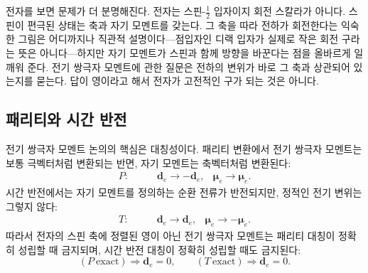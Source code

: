 전자를 보면 문제가 더 분명해진다. 전자는 스핀-\(\tfrac12\) 입자이지 회전 스칼라가 아니다. 스핀이 편극된 상태는 축과 자기 모멘트를 갖는다. 그 축을 따라 전하가 회전한다는 익숙한 그림은 어디까지나 직관적 설명이다---점입자인 디랙 입자가 실제로 작은 회전 구라는 뜻은 아니다---하지만 자기 모멘트가 스핀과 함께 방향을 바꾼다는 점을 올바르게 일깨워 준다. 전기 쌍극자 모멘트에 관한 질문은 전하의 변위가 바로 그 축과 상관되어 있는지를 묻는다. 답이 영이라고 해서 전자가 고전적인 구가 되는 것은 아니다.

\begin{classroomqa}
\end{classroomqa}

\begin{classroomqa}
\end{classroomqa}

\subsection{패리티와 시간 반전}

전기 쌍극자 모멘트 논의의 핵심은 대칭성이다. 패리티 변환에서 전기 쌍극자 모멘트는 보통 극벡터처럼 변환되는 반면, 자기 모멘트는 축벡터처럼 변환된다:
\begin{align}
P:\qquad &\mathbf d_e \to -\mathbf d_e,
&\boldsymbol{\mu}_e \to \boldsymbol{\mu}_e .
\end{align}
시간 반전에서는 자기 모멘트를 정의하는 순환 전류가 반전되지만, 정적인 전기 변위는 그렇지 않다:
\begin{align}
T:\qquad &\mathbf d_e \to \mathbf d_e,
&\boldsymbol{\mu}_e \to -\boldsymbol{\mu}_e .
\end{align}
따라서 전자의 스핀 축에 정렬된 영이 아닌 전기 쌍극자 모멘트는 패리티 대칭이 정확히 성립할 때 금지되며, 시간 반전 대칭이 정확히 성립할 때도 금지된다:
\begin{equation}
(P\ \text{exact}) \Rightarrow \mathbf d_e=0,
\qquad
(T\ \text{exact}) \Rightarrow \mathbf d_e=0.
\end{equation}

